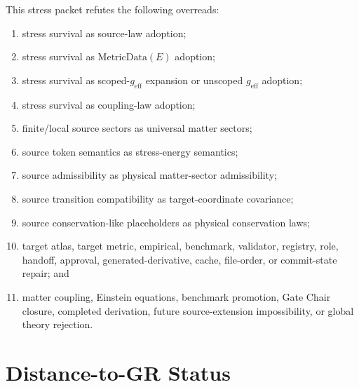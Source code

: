 \documentclass[11pt]{article}
\newcommand{\geff}{g_{\mathrm{eff}}}
\newcommand{\MetricData}{\mathrm{MetricData}}
\begin{document}
This stress packet refutes the following overreads:
\begin{enumerate}[leftmargin=*]
  \item stress survival as source-law adoption;
  \item stress survival as \(\MetricData(E)\) adoption;
  \item stress survival as scoped-\(\geff\) expansion or unscoped \(\geff\)
  adoption;
  \item stress survival as coupling-law adoption;
  \item finite/local source sectors as universal matter sectors;
  \item source token semantics as stress-energy semantics;
  \item source admissibility as physical matter-sector admissibility;
  \item source transition compatibility as target-coordinate covariance;
  \item source conservation-like placeholders as physical conservation laws;
  \item target atlas, target metric, empirical, benchmark, validator,
  registry, role, handoff, approval, generated-derivative, cache, file-order,
  or commit-state repair; and
  \item matter coupling, Einstein equations, benchmark promotion, Gate Chair
  closure, completed derivation, future source-extension impossibility, or
  global theory rejection.
\end{enumerate}

\section{Distance-to-GR Status}
\end{document}
